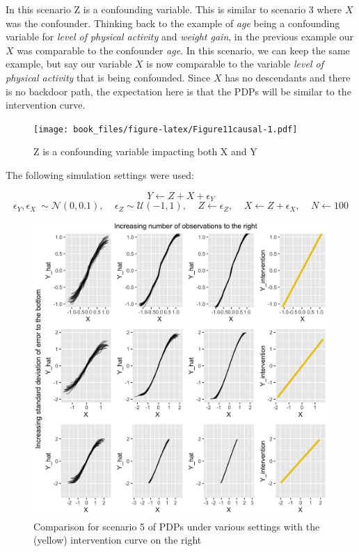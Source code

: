 \documentclass[]{krantz}
\begin{document}
In this scenario Z is a confounding variable. This is similar to
scenario 3 where \(X\) was the confounder. Thinking back to the example
of \emph{age} being a confounding variable for \emph{level of physical
activity} and \emph{weight gain}, in the previous example our \(X\) was
comparable to the confounder \emph{age}. In this scenario, we can keep
the same example, but say our variable \(X\) is now comparable to the
variable \emph{level of physical activity} that is being confounded.
Since \(X\) has no descendants and there is no backdoor path, the
expectation here is that the PDPs will be similar to the intervention
curve.

\begin{figure}
\centering
\texttt{[image: book\_files/figure-latex/Figure11causal-1.pdf]}
\caption{\label{fig:Figure11causal}Z is a confounding variable impacting
both X and Y}
\end{figure}

The following simulation settings were used:

\[ Y \leftarrow Z + X + \epsilon_Y  \]
\[ \epsilon_Y,\epsilon_X ~ \sim \mathcal{N}(0, 0.1), \ \ \ \ \ \epsilon_Z \sim \mathcal{U}(-1,1), \ \ \ \ \ Z \leftarrow \epsilon_Z, \ \ \ \ \ X \leftarrow Z + \epsilon_X, \ \ \ \ \ N \leftarrow 100 \]

\begin{figure}

\includegraphics[width=1\linewidth]{images/scenario5_all} \hfill{}

\caption{Comparison for scenario 5 of PDPs under various settings with the (yellow) intervention curve on the right}\label{fig:Figure12causal}
\end{figure}
\end{document}
